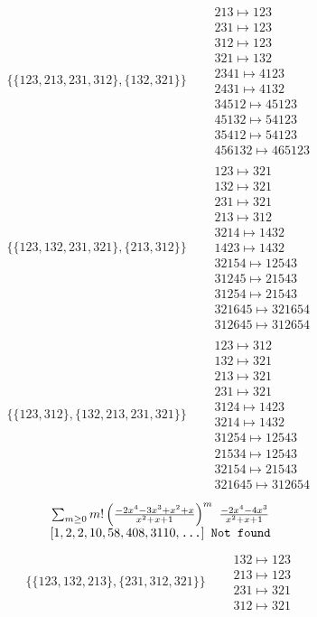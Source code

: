 \begin{tiny}
\begin{align}
\begin{matrix}
\end{matrix}
\\
\{\{123, 213, 231, 312\}, \{132, 321\}\}
\quad
&
\begin{matrix}
213 \mapsto 123\\231 \mapsto 123\\312 \mapsto 123\\321 \mapsto 132\\2341 \mapsto 4123\\2431 \mapsto 4132\\34512 \mapsto 45123\\45132 \mapsto 54123\\35412 \mapsto 54123\\456132 \mapsto 465123
\end{matrix}
\\
\{\{123, 132, 231, 321\}, \{213, 312\}\}
\quad
&
\begin{matrix}
123 \mapsto 321\\132 \mapsto 321\\231 \mapsto 321\\213 \mapsto 312\\3214 \mapsto 1432\\1423 \mapsto 1432\\32154 \mapsto 12543\\31245 \mapsto 21543\\31254 \mapsto 21543\\321645 \mapsto 321654\\312645 \mapsto 312654
\end{matrix}
\\
\{\{123, 312\}, \{132, 213, 231, 321\}\}
\quad
&
\begin{matrix}
123 \mapsto 312\\132 \mapsto 321\\213 \mapsto 321\\231 \mapsto 321\\3124 \mapsto 1423\\3214 \mapsto 1432\\31254 \mapsto 12543\\21534 \mapsto 12543\\32154 \mapsto 21543\\321645 \mapsto 312654
\end{matrix}
\end{align}
$$
\begin{matrix}
\sum_{m \geq 0} m! \left(
\frac{-2 x^{4} - 3 x^{3} + x^{2} + x}{x^{2} + x + 1}
\right)^m
\ 
\frac{-2 x^{4} - 4 x^{3}}{x^{2} + x + 1}
\\
\left[1, 2, 2, 10, 58, 408, 3110, \text{\texttt{...}}\right]
\ 
\texttt{Not found}
\end{matrix}
$$
\vspace{-1em}
\begin{align}
\{\{123, 132, 213\}, \{231, 312, 321\}\}
\quad
&
\begin{matrix}
132 \mapsto 123\\213 \mapsto 123\\231 \mapsto 321\\312 \mapsto 321
\end{matrix}
\end{align}
\end{tiny}
